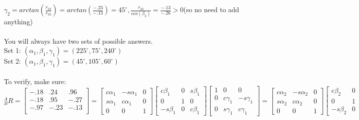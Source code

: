 \documentclass{article}
\begin{document}
$\gamma_2=arctan(\frac{r_{32}}{r_{33}})=arctan(\frac{-.23}{-.13})=45^{\circ}, \frac{r_{33}}{cos(\beta_2)}=\frac{-.13}{-.26} > 0$(so no need to add anything)\\\\
You will always have two sets of possible answers.\\
Set 1: $(\alpha_1, \beta_1, \gamma_1)=(225^{\circ}, 75^{\circ}, 240^{\circ})$\\
Set 2: $(\alpha_1, \beta_1, \gamma_1)=(45^{\circ}, 105^{\circ},60 ^{\circ})$\\\\
To verify, make sure:\\
${}^{A}_{B}R=\begin{bmatrix}
-.18 & .24 & .96 \\
-.18 & .95 & -.27 \\
-.97 & -.23 & -.13 \\
\end{bmatrix}=
\begin{bmatrix}
c\alpha_1 & -s\alpha_1 & 0\\
s\alpha_1 & c\alpha_1 & 0 \\
0 & 0 & 1
\end{bmatrix}
\begin{bmatrix}
c\beta_1 & 0 & s\beta_1\\
0 & 1 & 0 \\
-s\beta_1 & 0 & c\beta_1
\end{bmatrix}
\begin{bmatrix}
1 & 0 & 0\\
0 & c\gamma_1 & -s\gamma_1 \\
0 & s\gamma_1 & c\gamma_1
\end{bmatrix}=
\begin{bmatrix}
c\alpha_2 & -s\alpha_2 & 0\\
s\alpha_2 & c\alpha_2 & 0 \\
0 & 0 & 1
\end{bmatrix}
\begin{bmatrix}
c\beta_2 & 0 & s\beta_2\\
0 & 1 & 0 \\
-s\beta_2 & 0 & c\beta_2
\end{bmatrix}
\begin{bmatrix}
1 & 0 & 0\\
0 & c\gamma_2 & -s\gamma_2 \\
0 & s\gamma_2 & c\gamma_2
\end{bmatrix}$
\end{document}
